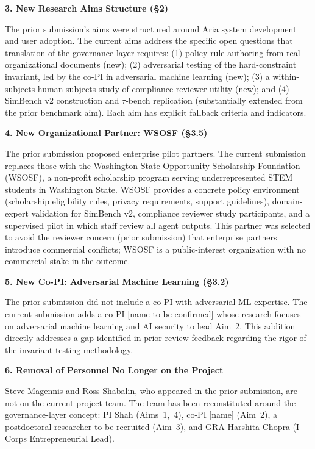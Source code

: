 \documentclass[11pt]{article}
\begin{document}
\bigskip
\noindent\textbf{3. New Research Aims Structure (§2)}

The prior submission's aims were structured around Aria system development and user adoption. The current aims address the specific open questions that translation of the governance layer requires: (1) policy-rule authoring from real organizational documents (new); (2) adversarial testing of the hard-constraint invariant, led by the co-PI in adversarial machine learning (new); (3) a within-subjects human-subjects study of compliance reviewer utility (new); and (4) SimBench v2 construction and $\tau$-bench replication (substantially extended from the prior benchmark aim). Each aim has explicit fallback criteria and indicators.

\bigskip
\noindent\textbf{4. New Organizational Partner: WSOSF (§3.5)}

The prior submission proposed enterprise pilot partners. The current submission replaces those with the Washington State Opportunity Scholarship Foundation (WSOSF), a non-profit scholarship program serving underrepresented STEM students in Washington State. WSOSF provides a concrete policy environment (scholarship eligibility rules, privacy requirements, support guidelines), domain-expert validation for SimBench v2, compliance reviewer study participants, and a supervised pilot in which staff review all agent outputs. This partner was selected to avoid the reviewer concern (prior submission) that enterprise partners introduce commercial conflicts; WSOSF is a public-interest organization with no commercial stake in the outcome.

\bigskip
\noindent\textbf{5. New Co-PI: Adversarial Machine Learning (§3.2)}

The prior submission did not include a co-PI with adversarial ML expertise. The current submission adds a co-PI [name to be confirmed] whose research focuses on adversarial machine learning and AI security to lead Aim~2. This addition directly addresses a gap identified in prior review feedback regarding the rigor of the invariant-testing methodology.

\bigskip
\noindent\textbf{6. Removal of Personnel No Longer on the Project}

Steve Magennis and Ross Shabalin, who appeared in the prior submission, are not on the current project team. The team has been reconstituted around the governance-layer concept: PI Shah (Aims~1,~4), co-PI [name] (Aim~2), a postdoctoral researcher to be recruited (Aim~3), and GRA Harshita Chopra (I-Corps Entrepreneurial Lead).
\end{document}
